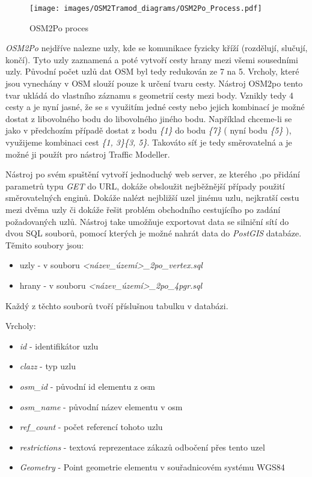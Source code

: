 \begin{figure}[htbp]
\centering
\texttt{[image: images/OSM2Tramod\_diagrams/OSM2Po\_Process.pdf]}
\caption{OSM2Po proces}
\label{obr:osm2po_proces}
\end{figure}
\vspace{10pt}

\textit{OSM2Po} nejdříve nalezne uzly, kde se komunikace fyzicky kříží (rozdělují, slučují, končí). Tyto uzly zaznamená a poté vytvoří cesty hrany mezi všemi sousedními uzly. Původní počet uzlů dat OSM byl tedy redukován ze 7 na 5. Vrcholy, které jsou vynechány v OSM slouží pouze k určení tvaru cesty. Nástroj OSM2po tento tvar ukládá do vlastního záznamu s geometrií cesty mezi body. Vznikly tedy 4 cesty a je nyní jasné, že se s využitím jedné cesty nebo jejich kombinací je možné dostat z libovolného bodu do libovolného jiného bodu. Například chceme-li se jako v předchozím případě dostat z bodu \textit{\{1\}} do bodu \textit{\{7\}} ( nyní bodu \textit{\{5\}} ), využijeme kombinaci cest \textit{\{1, 3\}\{3, 5\}}. Takováto síť je tedy směrovatelná a je možné ji použít pro nástroj Traffic Modeller. 

Nástroj po svém spuštění vytvoří jednoduchý web server, ze kterého ,po přidání parametrů typu \textit{GET} do URL, dokáže obsloužit nejběžnější případy použití směrovatelných enginů. Dokáže nalézt nejbližší uzel jinému uzlu, nejkratší cestu mezi dvěma uzly či dokáže řešit problém obchodního cestujícího po zadání požadovaných uzlů. Nástroj take umožňuje exportovat data se silniční sítí do dvou SQL souborů, pomocí kterých je možné nahrát data do \textit{PostGIS} databáze. Těmito soubory jsou:

\begin{itemize}
  \item uzly - v souboru \textit{<název\_území>\_2po\_vertex.sql} 
  \item hrany - v souboru \textit{<název\_území>\_2po\_4pgr.sql} 
\end{itemize} 

Každý z těchto souborů tvoří příslušnou tabulku v databázi.

Vrcholy:
\begin{itemize}
  \item \textit{id} - identifikátor uzlu
  \item \textit{clazz} - typ uzlu
  \item \textit{osm\_id} - původní id elementu z osm
  \item \textit{osm\_name} - původní název elementu v osm
  \item \textit{ref\_count} - počet referencí tohoto uzlu
  \item \textit{restrictions} - textová reprezentace zákazů odbočení přes tento uzel
  \item \textit{Geometry} - Point geometrie elementu v souřadnicovém systému WGS84
\end{itemize}
\vspace{10pt}

